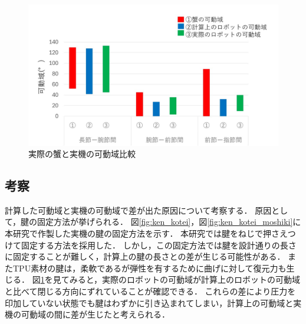 %
\begin{table}[!ht]
    \centering
    \vspace{-2mm}
    \caption{実際の蟹と実機の可動域比較}
    \vspace{1mm}
    \label{tab:kadouiki}
\end{table}
%
\begin{figure}
    \centering
    \includegraphics[scale=0.45]{image/kadouiki_graph.jpg}
    \caption{実際の蟹と実機の可動域比較}
    \label{fig:kadouiki_graph}
\end{figure}
\clearpage
\subsection{考察}
計算した可動域と実機の可動域で差が出た原因について考察する．
原因として，腱の固定方法が挙げられる．
図\ref{fig:ken_kotei}，図\ref{fig:ken_kotei_moshiki}に本研究で作製した実機の腱の固定方法を示す．
本研究では腱をねじで押さえつけて固定する方法を採用した．
しかし，この固定方法では腱を設計通りの長さに固定することが難しく，計算上の腱の長さとの差が生じる可能性がある．
またTPU素材の腱は，柔軟であるが弾性を有するために曲げに対して復元力も生じる．
図\ref{fig:kadouiki_graph}を見てみると，実際のロボットの可動域が計算上のロボットの可動域と比べて閉じる方向にずれていることが確認できる．
これらの差により圧力を印加していない状態でも腱はわずかに引き込まれてしまい，計算上の可動域と実機の可動域の間に差が生じたと考えられる．

